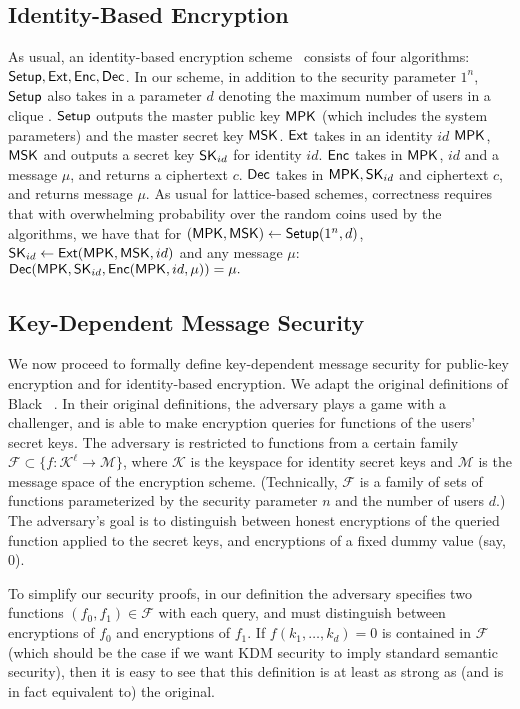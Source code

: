 \else
\subsection{Identity-Based Encryption}

As usual, an identity-based encryption
scheme~\cite{DBLP:journals/siamcomp/BonehF03} consists of four
algorithms: $\mathsf{Setup}, \mathsf{Ext}, \mathsf{Enc}, \mathsf{Dec}$. In our scheme, in
addition to the security parameter $1^n$, $\mathsf{Setup}$ also takes in a
parameter $d$ denoting the maximum number of users in a clique
. $\mathsf{Setup}$ outputs the master public key $\mathsf{MPK}$ (which
includes the system parameters) and the master secret key
$\mathsf{MSK}$. $\mathsf{Ext}$ takes in an identity $id$ $\mathsf{MPK}$, $\mathsf{MSK}$ and outputs
a secret key $\mathsf{SK}_{id}$ for identity $id$. $\mathsf{Enc}$ takes in
$\mathsf{MPK}$, $id$ and a message $\mu$, and returns a ciphertext
$c$. $\mathsf{Dec}$ takes in $\mathsf{MPK}, \mathsf{SK}_{id}$ and ciphertext $c$, and
returns message $\mu$. As usual for lattice-based schemes, correctness
requires that with overwhelming probability over the random coins used
by the algorithms, we have that for $(\mathsf{MPK}, \mathsf{MSK})\gets
\mathsf{Setup}(1^n,d)$, $\mathsf{SK}_{id} \gets \mathsf{Ext}(\mathsf{MPK}, \mathsf{MSK}, id)$ and
any message $\mu$: $\mathsf{Dec}(\mathsf{MPK}, \mathsf{SK}_{id}, \mathsf{Enc}(\mathsf{MPK}, id, \mu)) = \mu.$
\subsection{Key-Dependent Message Security}
\label{subsec:KDM}

We now proceed to formally define key-dependent message security for
public-key encryption and for identity-based encryption. We adapt the
original definitions of Black
\etal~\cite{DBLP:conf/sacrypt/BlackRS02}. In their original
definitions, the adversary plays a game with a challenger, and is able
to make encryption queries for functions of the users' secret
keys. The adversary is restricted to functions from a certain family
$\mathcal{F} \subset \{f: \mathcal{K}^{\ell} \to \mathcal{M} \}$,
where $\mathcal{K}$ is the keyspace for identity secret keys and
$\mathcal{M}$ is the message space of the encryption
scheme. (Technically, $\mathcal{F}$ is a family of sets of functions
parameterized by the security parameter $n$ and the number of users
$d$.)  The adversary's goal is to distinguish between honest
encryptions of the queried function applied to the secret keys, and
encryptions of a fixed dummy value (say, $0$).

To simplify our security proofs, in our definition the adversary
specifies two functions $(f_0, f_1) \in \mathcal{F}$ with each query,
and must distinguish between encryptions of $f_0$ and encryptions of
$f_1$. If $f(k_1, \ldots, k_d)=0$ is contained in $\mathcal{F}$ (which
should be the case if we want KDM security to imply standard semantic
security), then it is easy to see that this definition is at least as
strong as (and is in fact equivalent to) the original.

